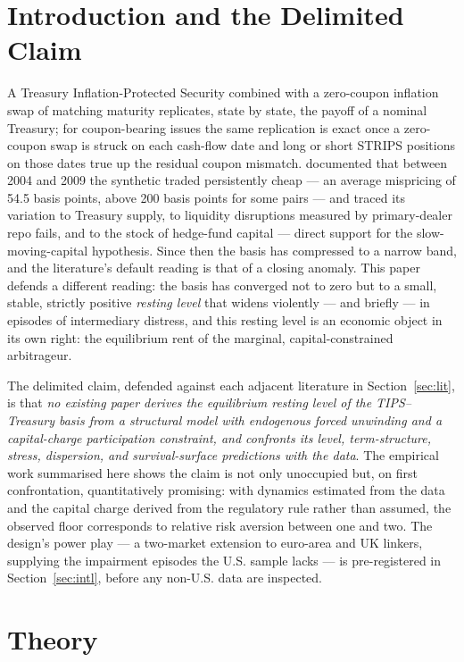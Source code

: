 \documentclass[11pt]{article}
\begin{document}
\section{Introduction and the Delimited Claim}

A Treasury Inflation-Protected Security combined with a zero-coupon inflation swap of matching maturity replicates, state by state, the payoff of a nominal Treasury; for coupon-bearing issues the same replication is exact once a zero-coupon swap is struck on each cash-flow date and long or short STRIPS positions on those dates true up the residual coupon mismatch. \citet{fll2014} documented that between 2004 and 2009 the synthetic traded persistently cheap --- an average mispricing of 54.5 basis points, above 200 basis points for some pairs --- and traced its variation to Treasury supply, to liquidity disruptions measured by primary-dealer repo fails, and to the stock of hedge-fund capital --- direct support for the slow-moving-capital hypothesis. Since then the basis has compressed to a narrow band, and the literature's default reading is that of a closing anomaly. This paper defends a different reading: the basis has converged not to zero but to a small, stable, strictly positive \emph{resting level} that widens violently --- and briefly --- in episodes of intermediary distress, and this resting level is an economic object in its own right: the equilibrium rent of the marginal, capital-constrained arbitrageur.

The delimited claim, defended against each adjacent literature in Section~\ref{sec:lit}, is that \emph{no existing paper derives the equilibrium resting level of the TIPS--Treasury basis from a structural model with endogenous forced unwinding and a capital-charge participation constraint, and confronts its level, term-structure, stress, dispersion, and survival-surface predictions with the data}. The empirical work summarised here shows the claim is not only unoccupied but, on first confrontation, quantitatively promising: with dynamics estimated from the data and the capital charge derived from the regulatory rule rather than assumed, the observed floor corresponds to relative risk aversion between one and two. The design's power play --- a two-market extension to euro-area and UK linkers, supplying the impairment episodes the U.S. sample lacks --- is pre-registered in Section~\ref{sec:intl}, before any non-U.S. data are inspected.

\section{Theory}\label{sec:theory}
\end{document}
